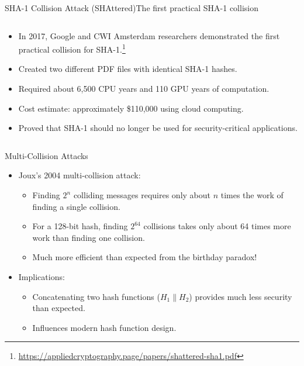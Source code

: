 \documentclass[aspectratio=169, lualatex, handout]{beamer}
\begin{document}
\begin{frame}{SHA-1 Collision Attack (SHAttered)}{The first practical SHA-1 collision}
	\begin{columns}[c]
		\begin{column}{1\textwidth}
			\begin{itemize}[<+->]
				\item In 2017, Google and CWI Amsterdam researchers demonstrated the first practical collision for SHA-1.\footnote{\url{https://appliedcryptography.page/papers/shattered-sha1.pdf}}
				\item Created two different PDF files with identical SHA-1 hashes.
				\item Required about 6,500 CPU years and 110 GPU years of computation.
				\item Cost estimate: approximately \$110,000 using cloud computing.
				\item Proved that SHA-1 should no longer be used for security-critical applications.
			\end{itemize}
		\end{column}
	\end{columns}
\end{frame}

\begin{frame}{Multi-Collision Attacks}
	\begin{itemize}[<+->]
		\item Joux's 2004 multi-collision attack:
		      \begin{itemize}
			      \item Finding $2^n$ colliding messages requires only about $n$ times the work of finding a single collision.
			      \item For a 128-bit hash, finding $2^{64}$ collisions takes only about 64 times more work than finding one collision.
			      \item Much more efficient than expected from the birthday paradox!
		      \end{itemize}
		\item Implications:
		      \begin{itemize}
			      \item Concatenating two hash functions ($H_1 \| H_2$) provides much less security than expected.
			      \item Influences modern hash function design.
		      \end{itemize}
	\end{itemize}
\end{frame}
\end{document}
